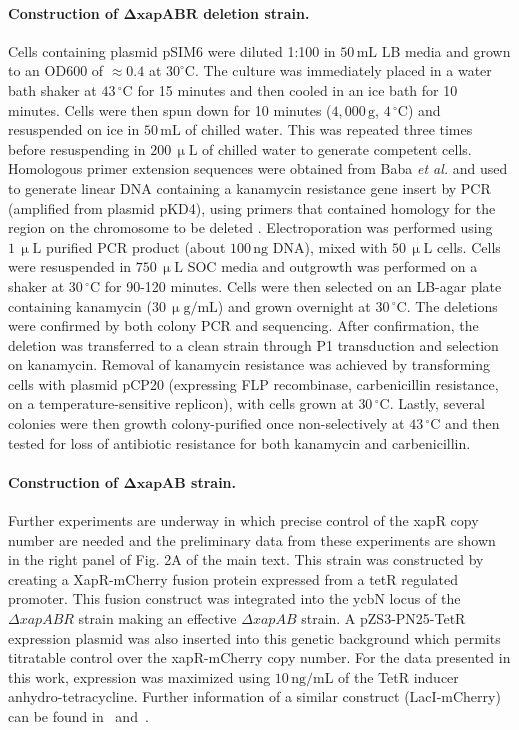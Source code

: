 \documentclass[10pt,letterpaper]{article}
\newcommand{\unit}[1]{\,\mathrm{#1}}
\begin{document}
\paragraph{Construction of $\bm{\Delta{xapABR}}$ deletion strain.} Cells containing
plasmid pSIM6 were diluted 1:100 in $50 \unit{mL}$ LB media and grown to an OD600
of $\approx 0.4$ at $30^\circ$C. The culture was immediately placed in
a water bath shaker at $43\unit{^\circ C}$ for 15 minutes and then cooled in an
ice bath for 10 minutes. Cells were then spun down for 10 minutes
($4,000 \unit{g}$, $4\unit{^\circ C}$) and resuspended on ice in $50\unit{mL}$ of chilled
water. This was repeated three times before resuspending in $200 \unit{\upmu L}$
of chilled water to generate competent cells. Homologous primer
extension sequences were obtained from Baba {\it et al.} \cite{Baba2006}
and used to generate linear DNA containing a kanamycin resistance
gene insert by PCR (amplified from plasmid pKD4), using primers that
contained homology for the region on the chromosome to be deleted
\cite{Datsenko2000}. Electroporation was performed using $1 \unit{\upmu L}$
purified PCR product (about $100 \unit{ng}$ DNA), mixed with $50 \unit{\upmu L}$ cells.
Cells were resuspended in $750 \unit{\upmu L}$ SOC media and outgrowth was
performed on a shaker at $30\unit{^\circ C}$ for 90-120 minutes. Cells were then
selected on an LB-agar plate containing kanamycin ($30 \unit{\upmu g/mL}$) and
grown overnight at $30\unit{^\circ C}$. The deletions were confirmed by both
colony PCR and sequencing. After confirmation, the deletion was
transferred to a clean strain through P1 transduction and selection on
kanamycin. Removal of kanamycin resistance was achieved by transforming
cells with plasmid pCP20 (expressing FLP recombinase, carbenicillin
resistance, on a temperature-sensitive replicon), with cells grown at
$30\unit{^\circ C}$. Lastly, several colonies were then growth colony-purified
once non-selectively at $43\unit{^\circ C}$ and then tested for loss of
antibiotic resistance for both kanamycin and carbenicillin. 

\paragraph{Construction of $\bm{\Delta{xapAB}}$ strain.}
Further experiments are underway in which precise control of the xapR
copy number are needed and the preliminary data from these experiments
are shown in the right panel of Fig. 2A of the main text. This strain
was constructed by creating a XapR-mCherry fusion protein expressed from
a tetR regulated promoter. This fusion construct was integrated into the
ycbN locus of the $\Delta{xapABR}$ strain making an effective
$\Delta{xapAB}$ strain. A pZS3-PN25-TetR expression plasmid was also
inserted into this genetic background which permits titratable control
over the xapR-mCherry copy number. For the data presented in this work,
expression was maximized using $10 \unit{ng/mL}$ of the TetR inducer
anhydro-tetracycline. Further information of a similar construct
(LacI-mCherry) can be found in~\cite{Brewster2014} and~\cite{Chure2019}.
\end{document}
